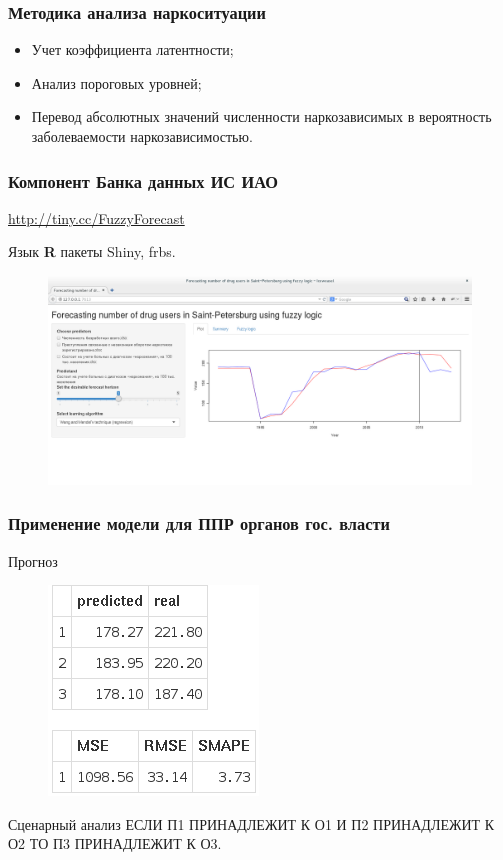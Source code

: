 \documentclass[t]{beamer}  %
\begin{document}
\begin{frame}
    \frametitle{Методика анализа наркоситуации} 
	\begin{itemize}
        \item Учет коэффициента латентности;
        \item Анализ пороговых уровней;
        \item Перевод абсолютных значений численности наркозависимых в
            вероятность заболеваемости наркозависимостью.
	\end{itemize}
\end{frame}

\begin{frame}
    \frametitle{Компонент Банка данных ИС ИАО}
    \url{http://tiny.cc/FuzzyForecast}
    \begin{block}{Язык \textbf{R}}
        пакеты \alert{Shiny}, \alert{frbs}.
    \end{block}
    \begin{figure}
        \centering
        \includegraphics[width=\textwidth]{screenshot1.png}
    \end{figure}
\end{frame}
\begin{frame}
    \frametitle{Применение модели для ППР органов гос. власти}
    \begin{block}{Прогноз}
        \begin{figure}
            \centering
            \includegraphics[scale=0.3]{values_small.png}
        \end{figure}
    \end{block}
    \begin{block}{Сценарный анализ}
        ЕСЛИ П1 ПРИНАДЛЕЖИТ К О1 И П2 ПРИНАДЛЕЖИТ К О2 ТО П3 ПРИНАДЛЕЖИТ К О3.
    \end{block}

\end{frame}
\end{document}
